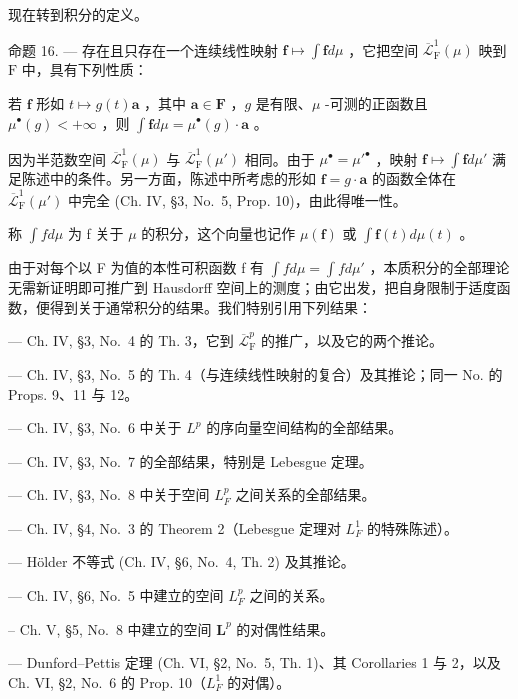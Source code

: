现在转到积分的定义。

命题 16. --- 存在且只存在一个连续线性映射 \(\mathbf{f} \mapsto \int \mathbf{f} d\mu\) ，它把空间 \(\overline{\mathcal{L}}_{\mathrm{F}}^{1}(\mu)\) 映到 \(\mathrm{F}\) 中，具有下列性质：

若 \(\mathbf{f}\) 形如 \(t \mapsto g(t)\mathbf{a}\) ，其中 \(\mathbf{a} \in \mathbf{F}\) ，\(g\) 是有限、\(\mu\) -可测的正函数且 \(\mu^{\bullet}(g) < +\infty\) ，则 \(\int \mathbf{f} d\mu = \mu^{\bullet}(g) \cdot \mathbf{a}\) 。

因为半范数空间 \(\overline{\mathcal{L}}_{\mathrm{F}}^{1}(\mu)\) 与 \(\overline{\mathcal{L}}_{\mathrm{F}}^{1}(\mu')\) 相同。由于 \(\mu^{\bullet} = \mu'^{\bullet}\) ，映射 \(\mathbf{f} \mapsto \int \mathbf{f} d\mu'\) 满足陈述中的条件。另一方面，陈述中所考虑的形如 \(\mathbf{f} = g \cdot \mathbf{a}\) 的函数全体在 \(\overline{\mathcal{L}}_{\mathrm{F}}^{1}(\mu')\) 中完全 (Ch. IV, §3, No.~5, Prop. 10)，由此得唯一性。

称 \(\int f d\mu\) 为 f 关于 \(\mu\) 的积分，这个向量也记作 \(\mu(\mathbf{f})\) 或 \(\int \mathbf{f}(t) d\mu(t)\) 。

由于对每个以 F 为值的本性可积函数 f 有 \(\int f d\mu = \int f d\mu'\) ，本质积分的全部理论无需新证明即可推广到 Hausdorff 空间上的测度；由它出发，把自身限制于适度函数，便得到关于通常积分的结果。我们特别引用下列结果：

--- Ch. IV, §3, No.~4 的 Th. 3，它到 \(\overline{\mathcal{L}}_{\mathrm{F}}^{p}\) 的推广，以及它的两个推论。

--- Ch. IV, §3, No.~5 的 Th. 4（与连续线性映射的复合）及其推论；同一 No. 的 Props. 9、11 与 12。

--- Ch. IV, §3, No.~6 中关于 \(L^{p}\) 的序向量空间结构的全部结果。

--- Ch. IV, §3, No.~7 的全部结果，特别是 Lebesgue 定理。

--- Ch. IV, §3, No.~8 中关于空间 \(L_F^p\) 之间关系的全部结果。

--- Ch. IV, §4, No.~3 的 Theorem 2（Lebesgue 定理对 \(L_F^1\) 的特殊陈述）。

--- Hölder 不等式 (Ch. IV, §6, No.~4, Th. 2) 及其推论。

--- Ch. IV, §6, No.~5 中建立的空间 \(L_{F}^{p}\) 之间的关系。

-- Ch. V, §5, No.~8 中建立的空间 \(\mathbf{L}^p\) 的对偶性结果。

--- Dunford--Pettis 定理 (Ch. VI, §2, No.~5, Th. 1)、其 Corollaries 1 与 2，以及 Ch. VI, §2, No.~6 的 Prop. 10（\(L_{F}^{1}\) 的对偶）。

